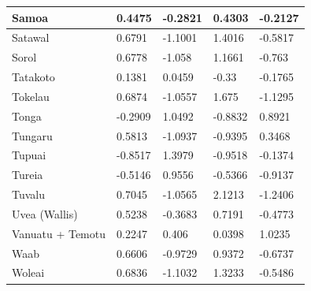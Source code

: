 \documentclass[draft,10pt]{article} %
\begin{document}
\begin{landscape}
\begin{longtable}{| p{2.6cm} |  p{2cm} | p{2cm}  | p{2cm}  | p{2cm}|}
 Samoa & 0.4475 & -0.2821 & 0.4303 & -0.2127 \\ \hline
 Satawal & 0.6791 & -1.1001 & 1.4016 & -0.5817 \\ \hline
 Sorol & 0.6778 & -1.058 & 1.1661 & -0.763 \\ \hline
 Tatakoto & 0.1381 & 0.0459 & -0.33 & -0.1765 \\ \hline
 Tokelau & 0.6874 & -1.0557 & 1.675 & -1.1295 \\ \hline
 Tonga & -0.2909 & 1.0492 & -0.8832 & 0.8921 \\ \hline
 Tungaru & 0.5813 & -1.0937 & -0.9395 & 0.3468 \\ \hline
 Tupuai & -0.8517 & 1.3979 & -0.9518 & -0.1374 \\ \hline
 Tureia & -0.5146 & 0.9556 & -0.5366 & -0.9137 \\ \hline
 Tuvalu & 0.7045 & -1.0565 & 2.1213 & -1.2406 \\ \hline
 Uvea (Wallis) & 0.5238 & -0.3683 & 0.7191 & -0.4773 \\ \hline
 Vanuatu + Temotu & 0.2247 & 0.406 & 0.0398 & 1.0235 \\ \hline
 Waab & 0.6606 & -0.9729 & 0.9372 & -0.6737 \\ \hline
 Woleai & 0.6836 & -1.1032 & 1.3233 & -0.5486 \\ \hline





 \end{longtable}
\end{landscape}








\newpage
\end{document}
